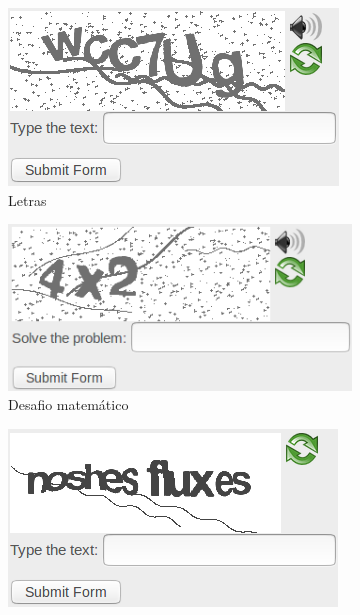 \begin{figure}[ht]
	\caption{Diferentes tipos de CAPTCHAs}
	\label{diffcaptchas}
	\begin{subfigure}{.5\textwidth}
		\centering
		\includegraphics[width=.9\linewidth]{figuras/captcha_letras.png}
		\caption{Letras}
	\end{subfigure}
	\begin{subfigure}{.5\textwidth}
		\centering
		\includegraphics[width=.9\linewidth]{figuras/captcha_mat.png}
		\caption{Desafio matemático}
	\end{subfigure}%
	\vspace{.05\linewidth}
	\begin{subfigure}{.5\textwidth}
		\centering
		\includegraphics[width=.9\linewidth]{figuras/captcha_texto.png}

\end{subfigure}
\end{figure}
